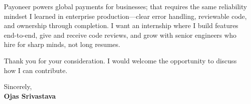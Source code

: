 \documentclass[a4paper,11pt]{article}
\begin{document}
Payoneer powers global payments for businesses; that requires the same reliability mindset I learned in enterprise production---clear error handling, reviewable code, and ownership through completion. I want an internship where I build features end-to-end, give and receive code reviews, and grow with senior engineers who hire for sharp minds, not long resumes.

Thank you for your consideration. I would welcome the opportunity to discuss how I can contribute.

Sincerely, \\
\vspace{8mm}
\textbf{Ojas Srivastava}
\end{document}
